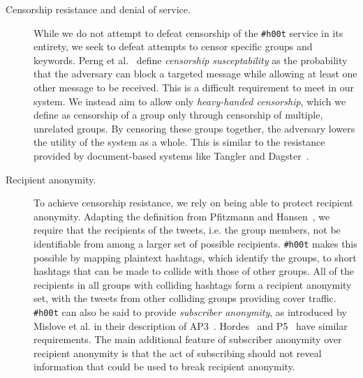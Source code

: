 \documentclass{sig-alternate-arxiv}
\newcommand{\hoot}{{\tt \#h00t}\xspace}
\begin{document}
\begin{description}
\item[Censorship resistance and denial of service.] While we do not
  attempt to defeat censorship of the \hoot service in its entirety, we
  seek to defeat attempts to censor specific groups and keywords. Perng
  et al.~\cite{perng05revisited} define {\em censorship susceptability}
  as the probability that the adversary can block a targeted message
  while allowing at least one other message to be received. This is a
  difficult requirement to meet in our system. We instead aim to allow
  only {\em heavy-handed censorship}, which we define as censorship of a
  group only through censorship of multiple, unrelated groups. By
  censoring these groups together, the adversary lowers the utility of
  the system as a whole. This is similar to the resistance provided by
  document-based systems like Tangler and
  Dagster~\cite{tangler,dagster}.

\item[Recipient anonymity.] To achieve censorship resistance, we rely on
  being able to protect recipient anonymity. Adapting the definition
  from Pfitzmann and Hansen~\cite{terminology}, we require that the
  recipients of the tweets, i.e. the group members, not be identifiable
  from among a larger set of possible recipients. \hoot makes this
  possible by mapping plaintext hashtags, which identify the groups, to
  short hashtags that can be made to collide with those of other
  groups. All of the recipients in all groups with colliding hashtags
  form a recipient anonymity set, with the tweets from other colliding
  groups providing cover traffic. \hoot can also be said to provide
  {\em subscriber anonymity}, as introduced by Mislove et al. in their
  description of AP3~\cite{ap3}. Hordes~\cite{hordes} and P5~\cite{P5}
  have similar requirements. The main additional feature of subscriber
  anonymity over recipient anonymity is that the act of subscribing
  should not reveal information that could be used to break recipient
  anonymity.



\end{description}
\end{document}
